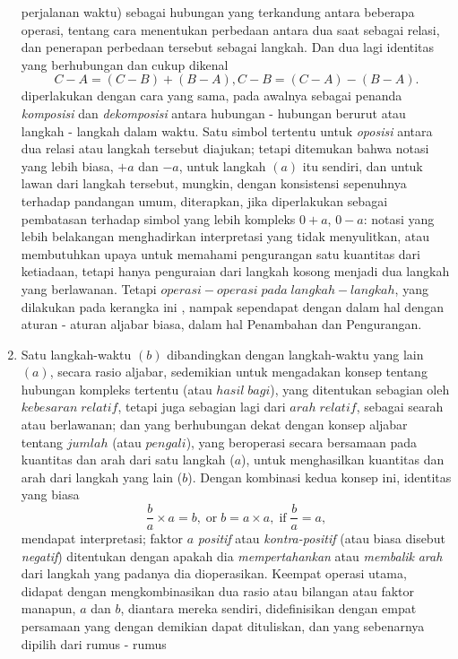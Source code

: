 \documentclass[a4paper, 12pt]{book}
\begin{document}
\begin{enumerate}
perjalanan waktu) sebagai hubungan yang terkandung antara beberapa operasi,
tentang  cara menentukan perbedaan antara dua saat sebagai relasi, dan 
penerapan perbedaan tersebut sebagai langkah. Dan dua lagi identitas yang 
berhubungan dan cukup dikenal
\[
C - A = (C - B) + (B - A), C - B = (C - A) - (B - A).
\]
diperlakukan dengan cara yang sama, pada awalnya sebagai penanda 
\textit{komposisi} dan \textit{dekomposisi} antara hubungan - hubungan berurut
atau langkah - langkah dalam waktu. Satu simbol tertentu untuk \textit{oposisi}
antara dua relasi atau langkah tersebut diajukan; tetapi ditemukan bahwa
notasi yang lebih biasa, $+a$ dan $-a$, untuk langkah $(a)$ itu sendiri, dan
untuk lawan dari langkah tersebut, mungkin, dengan konsistensi sepenuhnya 
terhadap pandangan umum, diterapkan, jika diperlakukan sebagai pembatasan
terhadap simbol yang lebih kompleks $0 + a$, $0 - a$: notasi yang lebih 
belakangan menghadirkan interpretasi yang tidak menyulitkan, atau membutuhkan
upaya untuk memahami pengurangan satu kuantitas dari ketiadaan, tetapi hanya
penguraian dari langkah kosong menjadi dua langkah yang berlawanan. Tetapi 
$operasi - operasi \; pada \; langkah - langkah$, yang dilakukan pada kerangka ini
, nampak sependapat dengan dalam hal dengan aturan - aturan aljabar biasa, 
dalam hal Penambahan dan Pengurangan.
\item Satu langkah-waktu $(b)$ dibandingkan dengan langkah-waktu yang lain
$(a)$, secara rasio aljabar, sedemikian untuk mengadakan konsep tentang
hubungan kompleks tertentu (atau $hasil\; bagi$), yang ditentukan sebagian oleh
$kebesaran\; relatif$, tetapi juga sebagian lagi dari $arah\; relatif$, sebagai
searah atau berlawanan; dan yang berhubungan dekat dengan konsep aljabar 
tentang $jumlah$ (atau $pengali$), yang beroperasi secara bersamaan pada
kuantitas dan arah dari satu langkah ($a$), untuk 
menghasilkan kuantitas dan arah dari langkah yang lain ($b$). Dengan kombinasi
kedua konsep ini, identitas yang biasa
\[
\frac{b}{a} \times a = b, \; \text{or} \;  b = a \times a, \;\text{if} \; \frac{b}{a}=a,
\] 
mendapat interpretasi; faktor $a$ \textit{positif} atau 
\textit{kontra-positif} (atau biasa disebut \textit{negatif}) ditentukan dengan
apakah dia \textit{mempertahankan} atau \textit{membalik} \textit{arah} dari
langkah yang padanya dia dioperasikan. Keempat operasi utama, didapat dengan 
mengkombinasikan dua rasio atau bilangan atau faktor manapun, $a$ dan $b$, 
diantara mereka sendiri, didefinisikan dengan empat persamaan yang dengan
demikian dapat dituliskan, dan yang sebenarnya dipilih dari rumus - rumus

\end{enumerate}
\end{document}
